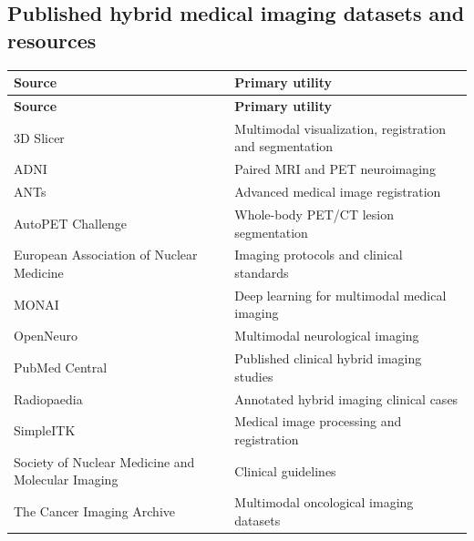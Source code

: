 \subsection{Published hybrid medical imaging datasets and resources}
\begin{longtable}{@{}p{}p{}@{}}
\toprule
\textbf{Source} & \textbf{Primary utility} \\
\midrule
\endfirsthead
\toprule
\textbf{Source} & \textbf{Primary utility} \\
\midrule
\endhead
3D Slicer & Multimodal visualization, registration and segmentation \\
ADNI & Paired MRI and PET neuroimaging \\
ANTs & Advanced medical image registration \\
AutoPET Challenge & Whole-body PET/CT lesion segmentation \\
European Association of Nuclear Medicine & Imaging protocols and clinical standards \\
MONAI & Deep learning for multimodal medical imaging \\
OpenNeuro & Multimodal neurological imaging \\
PubMed Central & Published clinical hybrid imaging studies \\
Radiopaedia & Annotated hybrid imaging clinical cases \\
SimpleITK & Medical image processing and registration \\
Society of Nuclear Medicine and Molecular Imaging & Clinical guidelines \\
The Cancer Imaging Archive & Multimodal oncological imaging datasets \\
\bottomrule
\end{longtable}

